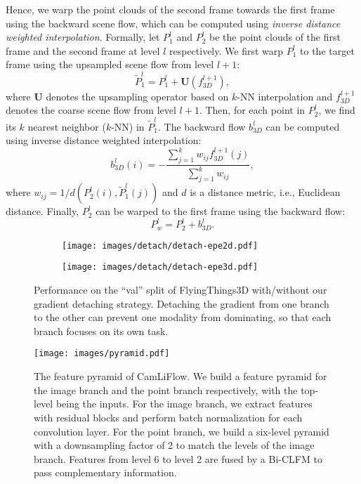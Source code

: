 \documentclass[10pt,twocolumn,letterpaper]{article}
\begin{document}
Hence, we warp the point clouds of the second frame towards the first frame using the backward scene flow, which can be computed using \textit{inverse distance weighted interpolation}. Formally, let $P_1^l$ and $P_2^l$ be the point clouds of the first frame and the second frame at level $l$ respectively. We first warp $P_1^l$ to the target frame using the upsampled scene flow from level $l+1$:
\begin{equation}
    \tilde{P}_1^l = P_1^l + \mathbf{U}(f_{3D}^{l+1}),
\end{equation}
where $\mathbf{U}$ denotes the upsampling operator based on $k$-NN interpolation and $f_{3D}^{l+1}$ denotes the coarse scene flow from level $l+1$. Then, for each point in $P_2^l$, we find its $k$ nearest neighbor ($k$-NN) in $\tilde{P}_1^l$. The backward flow $b_{3D}^l$ can be computed using inverse distance weighted interpolation:
\begin{equation}
    b_{3D}^l(i) = -\frac
    {\sum_{j=1}^k w_{ij} f_{3D}^{l+1}(j)}
    {\sum_{j=1}^k w_{ij}},
\end{equation}
where $w_{ij} = 1/d(P_2^l(i), \tilde{P}_1^l(j))$ and $d$ is a distance metric, i.e., Euclidean distance. Finally, $P_2^l$ can be warped to the first frame using the backward flow:
\begin{equation}
    P_w^l = P_2^l + b_{3D}^l.
\end{equation}

\begin{figure}[t]
    \centering
    \begin{subfigure}[b]{0.5\linewidth}
        \texttt{[image: images/detach/detach-epe2d.pdf]}\end{subfigure}\hfill
    \begin{subfigure}[b]{0.5\linewidth}
        \texttt{[image: images/detach/detach-epe3d.pdf]}\end{subfigure}\vspace{-5pt}
    \caption{Performance on the ``val'' split of FlyingThings3D with/without our gradient detaching strategy. Detaching the gradient from one branch to the other can prevent one modality from dominating, so that each branch focuses on its own task.}
    \vspace{-5pt}
    \label{fig:detach}
\end{figure}

\begin{figure*}
    \captionsetup[subfigure]{labelformat=empty}
    \texttt{[image: images/pyramid.pdf]}
    \caption{The feature pyramid of CamLiFlow. We build a feature pyramid for the image branch and the point branch respectively, with the top-level being the inputs. For the image branch, we extract features with residual blocks and perform batch normalization for each convolution layer. For the point branch, we build a six-level pyramid with a downsampling factor of 2 to match the levels of the image branch. Features from level 6 to level 2 are fused by a Bi-CLFM to pass complementary information.}
    \label{fig:pyramid}
\end{figure*}
\end{document}
